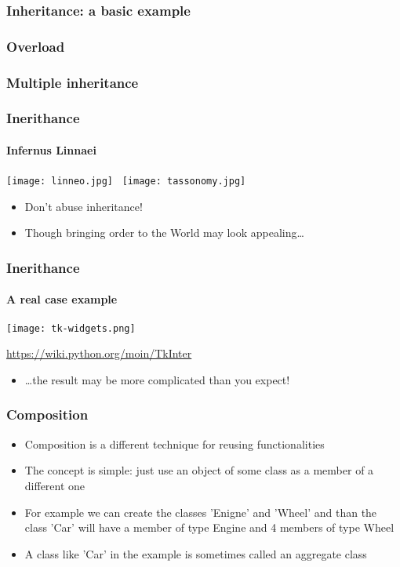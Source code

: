 \documentclass[9pt]{beamer}
\begin{document}
\begin{frame}
  \frametitle{Inheritance: a basic example}
  
\end{frame}


\begin{frame}
  \frametitle{Overload}
  
\end{frame}


\begin{frame}
  \frametitle{Multiple inheritance}
  
\end{frame}


\begin{frame}
  \frametitle{Inerithance}
  \framesubtitle{Infernus Linnaei}
  
  \centering
  \texttt{[image: linneo.jpg]}~\quad%
  \texttt{[image: tassonomy.jpg]}
  
  \bigskip
    
  \begin{itemize}
    \item Don't abuse inheritance!
    \medskip
    \item Though bringing order to the World may look appealing\dots
  \end{itemize}
  
\end{frame}


\begin{frame}
  \frametitle{Inerithance}
  \framesubtitle{A real case example}
  
  \centering
  \texttt{[image: tk-widgets.png]}
   
  \tiny \url{https://wiki.python.org/moin/TkInter} \normalsize
    
  \smallskip
  \begin{itemize}
    \item {\dots}the result may be more complicated than you expect!
  \end{itemize}
\end{frame}


\begin{frame}
  \frametitle{Composition}
    
  \begin{itemize}
    \item \alert{Composition} is a different technique for reusing functionalities
    \medskip
    \item The concept is simple: just use an object of some class as a member of
          a different one
    \medskip
    \item For example we can create the classes 'Enigne' and 'Wheel' and than 
          the class 'Car' will have a member of type Engine and 4 members of
          type Wheel
    \medskip
    \item A class like 'Car' in the example is sometimes called an 
          \alert{aggregate} class
  \end{itemize}
  
\end{frame}
\end{document}
